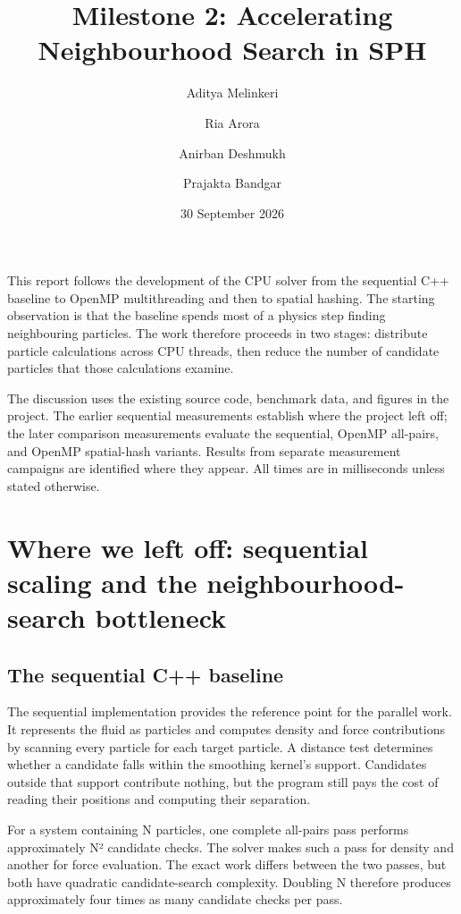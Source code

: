 \documentclass[
  11pt,
]{article}
\title{Milestone 2: Accelerating Neighbourhood Search in SPH}
\author{Aditya Melinkeri \and Ria Arora \and Anirban Deshmukh \and Prajakta Bandgar}
\date{30 September 2026}
\begin{document}
\maketitle

{
\setcounter{tocdepth}{2}
\tableofcontents
\clearpage
}
This report follows the development of the CPU solver from the
sequential C++ baseline to OpenMP multithreading and then to spatial
hashing. The starting observation is that the baseline spends most of a
physics step finding neighbouring particles. The work therefore proceeds
in two stages: distribute particle calculations across CPU threads, then
reduce the number of candidate particles that those calculations
examine.

The discussion uses the existing source code, benchmark data, and
figures in the project. The earlier sequential measurements establish
where the project left off; the later comparison measurements evaluate
the sequential, OpenMP all-pairs, and OpenMP spatial-hash variants.
Results from separate measurement campaigns are identified where they
appear. All times are in milliseconds unless stated otherwise.

\section{Where we left off: sequential scaling and the
neighbourhood-search
bottleneck}\label{where-we-left-off-sequential-scaling-and-the-neighbourhood-search-bottleneck}

\subsection{The sequential C++
baseline}\label{the-sequential-c-baseline}

The sequential implementation provides the reference point for the
parallel work. It represents the fluid as particles and computes density
and force contributions by scanning every particle for each target
particle. A distance test determines whether a candidate falls within
the smoothing kernel's support. Candidates outside that support
contribute nothing, but the program still pays the cost of reading their
positions and computing their separation.

For a system containing N particles, one complete all-pairs pass
performs approximately N² candidate checks. The solver makes such a pass
for density and another for force evaluation. The exact work differs
between the two passes, but both have quadratic candidate-search
complexity. Doubling N therefore produces approximately four times as
many candidate checks per pass.
\end{document}
